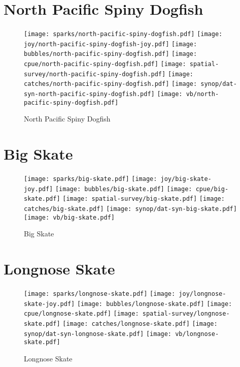 \section{North Pacific Spiny Dogfish}

\begin{figure}[htbp]
\centering
\texttt{[image: sparks/north-pacific-spiny-dogfish.pdf]}
\texttt{[image: joy/north-pacific-spiny-dogfish-joy.pdf]}
\texttt{[image: bubbles/north-pacific-spiny-dogfish.pdf]}
\texttt{[image: cpue/north-pacific-spiny-dogfish.pdf]}
\texttt{[image: spatial-survey/north-pacific-spiny-dogfish.pdf]}
\texttt{[image: catches/north-pacific-spiny-dogfish.pdf]}
\texttt{[image: synop/dat-syn-north-pacific-spiny-dogfish.pdf]}
\texttt{[image: vb/north-pacific-spiny-dogfish.pdf]}
\caption{North Pacific Spiny Dogfish}
\end{figure}
\clearpage
\section{Big Skate}

\begin{figure}[htbp]
\centering
\texttt{[image: sparks/big-skate.pdf]}
\texttt{[image: joy/big-skate-joy.pdf]}
\texttt{[image: bubbles/big-skate.pdf]}
\texttt{[image: cpue/big-skate.pdf]}
\texttt{[image: spatial-survey/big-skate.pdf]}
\texttt{[image: catches/big-skate.pdf]}
\texttt{[image: synop/dat-syn-big-skate.pdf]}
\texttt{[image: vb/big-skate.pdf]}
\caption{Big Skate}
\end{figure}
\clearpage
\section{Longnose Skate}

\begin{figure}[htbp]
\centering
\texttt{[image: sparks/longnose-skate.pdf]}
\texttt{[image: joy/longnose-skate-joy.pdf]}
\texttt{[image: bubbles/longnose-skate.pdf]}
\texttt{[image: cpue/longnose-skate.pdf]}
\texttt{[image: spatial-survey/longnose-skate.pdf]}
\texttt{[image: catches/longnose-skate.pdf]}
\texttt{[image: synop/dat-syn-longnose-skate.pdf]}
\texttt{[image: vb/longnose-skate.pdf]}
\caption{Longnose Skate}
\end{figure}
\clearpage
